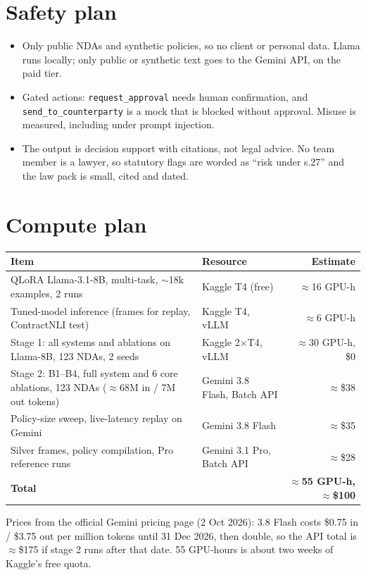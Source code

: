 \documentclass[11pt,a4paper]{article}
\begin{document}
\section{Safety plan}
\begin{itemize}
\item Only public NDAs and synthetic policies, so no client or personal data. Llama runs locally; only public or synthetic text goes to the Gemini API, on the paid tier.
\item Gated actions: \texttt{request\_approval} needs human confirmation, and \texttt{send\_to\_counterparty} is a mock that is blocked without approval. Misuse is measured, including under prompt injection.
\item The output is decision support with citations, not legal advice. No team member is a lawyer, so statutory flags are worded as ``risk under s.27'' and the law pack is small, cited and dated.
\end{itemize}

\section{Compute plan}
\begin{table}[H]\small
\begin{tabularx}{\textwidth}{@{}LXr@{}}
\toprule
\textbf{Item} & \textbf{Resource} & \textbf{Estimate} \\
\midrule
QLoRA Llama-3.1-8B, multi-task, $\sim$18k examples, 2 runs & Kaggle T4 (free) & $\approx$16 GPU-h \\
Tuned-model inference (frames for replay, ContractNLI test) & Kaggle T4, vLLM & $\approx$6 GPU-h \\
Stage 1: all systems and ablations on Llama-8B, 123 NDAs, 2 seeds & Kaggle 2$\times$T4, vLLM & $\approx$30 GPU-h, \$0 \\
Stage 2: B1--B4, full system and 6 core ablations, 123 NDAs ($\approx$68M in / 7M out tokens) & Gemini 3.8 Flash, Batch API & $\approx$\$38 \\
Policy-size sweep, live-latency replay on Gemini & Gemini 3.8 Flash & $\approx$\$35 \\
Silver frames, policy compilation, Pro reference runs & Gemini 3.1 Pro, Batch API & $\approx$\$28 \\
\midrule
\textbf{Total} & & \textbf{$\approx$55 GPU-h, $\approx$\$100} \\
\bottomrule
\end{tabularx}
\end{table}
\vspace{-4pt}
{\small Prices from the official Gemini pricing page (2 Oct 2026): 3.8 Flash costs \$0.75 in / \$3.75 out per million tokens until 31 Dec 2026, then double, so the API total is $\approx$\$175 if stage 2 runs after that date. 55 GPU-hours is about two weeks of Kaggle's free quota.}
\end{document}
